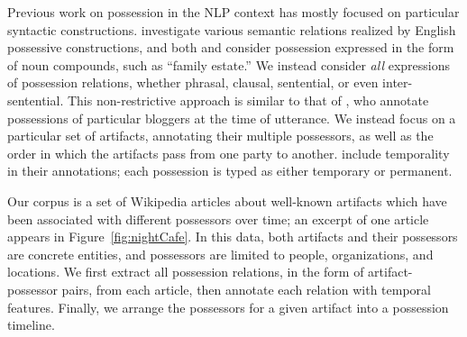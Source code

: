 Previous work on possession in the NLP context has mostly focused on particular syntactic constructions.
\citet{conf/acl/TratzH13} investigate various semantic relations realized by English possessive constructions, and both \citet{Nakov:2013:SIN:2483969.2483975} and \citet{Tratz:2010:TDC:1858681.1858751} consider possession expressed in the form of noun compounds, such as ``family estate.''
We instead consider \textit{all} expressions of possession relations, whether phrasal, clausal, sentential, or even inter-sentential.
This non-restrictive approach is similar to that of \citet{BANEA16.1105}, who annotate possessions of particular bloggers at the time of utterance.
We instead focus on a particular set of artifacts, annotating their multiple possessors, as well as the order in which the artifacts pass from one party to another.
\citet{BANEA16.1105} include temporality in their annotations; each possession is typed as either temporary or permanent.

Our corpus is a set of Wikipedia articles about well-known artifacts which have been associated with different possessors over time; an excerpt of one article appears in Figure~\ref{fig:nightCafe}.
In this data, both artifacts and their possessors are concrete entities, and possessors are limited to people, organizations, and locations.
We first extract all possession relations, in the form of artifact-possessor pairs, from each article, then annotate each relation with temporal features.
Finally, we arrange the possessors for a given artifact into a possession timeline.
 




